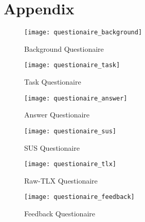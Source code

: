 \chapter{Appendix}\label{sec:appendix}

\begin{figure*}[!htb]
  \caption{Background Questionaire}
  \label{fig:questionaire_background}
  \centering
  \texttt{[image: questionaire\_background]}
\end{figure*}

\begin{figure*}[!htb]
  \caption{Task Questionaire}
  \label{fig:questionaire_task}
  \centering
  \texttt{[image: questionaire\_task]}
\end{figure*}

\begin{figure*}[!htb]
  \caption{Answer Questionaire}
  \label{fig:questionaire_answer}
  \centering
  \texttt{[image: questionaire\_answer]}
\end{figure*}

\begin{figure*}[!htb]
  \caption{SUS Questionaire}
  \label{fig:questionaire_sus}
  \centering
  \texttt{[image: questionaire\_sus]}
\end{figure*}

\begin{figure*}[!htb]
  \caption{Raw-TLX Questionaire}
  \label{fig:questionaire_tlx}
  \centering
  \texttt{[image: questionaire\_tlx]}
\end{figure*}

\begin{figure*}[!htb]
  \caption{Feedback Questionaire}
  \label{fig:questionaire_feedback}
  \centering
  \texttt{[image: questionaire\_feedback]}
\end{figure*}
